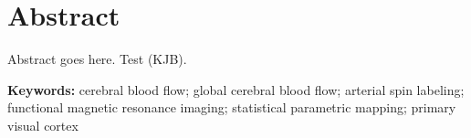 \section{Abstract}
Abstract goes here. Test (KJB).

\textbf{Keywords:} cerebral blood flow; global cerebral blood flow; arterial spin labeling; functional magnetic resonance imaging; statistical parametric mapping; primary visual cortex
